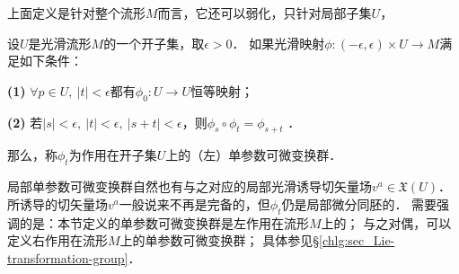 %
%
%

上面定义是针对整个流形$M$而言，它还可以弱化，只针对局部子集$U$，
\begin{definition}\label{chdm:def_1PTG-local}
    设$U$是光滑流形$M$的一个开子集，取$\epsilon>0$．
    如果光滑映射$\phi:(-\epsilon,\epsilon)\times U \to M $满足如下条件：
    
    {\bfseries (1)} $\forall p\in U,\ |t|< \epsilon$都有$\phi_0 : U\to U$恒等映射；
    
    {\bfseries (2)} 若$|s|<\epsilon,\ |t|<\epsilon, \ |s+t|<\epsilon$，则$\phi_s\circ \phi_t = \phi_{s+t}$ ．
    
    那么，称$\phi_t$为作用在开子集$U$上的{\heiti {}（左）单参数可微变换群}．
\end{definition}
局部单参数可微变换群自然也有与之对应的局部光滑诱导切矢量场$v^a\in \mathfrak{X}(U)$．
所诱导的切矢量场$v^a$一般说来不再是完备的，但$\phi_t$仍是局部微分同胚的．
需要强调的是：本节定义的单参数可微变换群是{\kaishu 左作用}在流形$M$上的；
与之对偶，可以定义{\kaishu 右作用}在流形$M$上的单参数可微变换群；
具体参见\S\ref{chlg:sec_Lie-transformation-group}．


